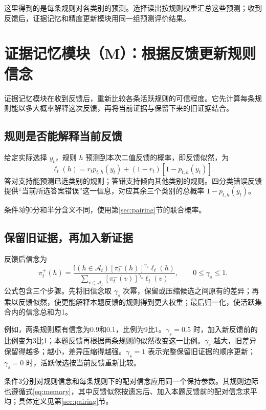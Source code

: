\documentclass[12pt]{article}
\newcommand{\ind}{\mathbb I}
\begin{document}
这里得到的是每条规则对各类别的预测。选择读出按规则权重汇总这些预测；收到反馈后，证据记忆和精度更新模块用同一组预测评价结果。

\section{证据记忆模块（M）：根据反馈更新规则信念}
\label{sec:memory}

证据记忆模块在收到反馈后，重新比较各条活跃规则的可信程度。它先计算每条规则能以多大概率解释这次反馈，再将当前证据与保留下来的旧证据结合。

\subsection{规则是否能解释当前反馈}

给定实际选择 $y_t$，规则 $h$ 预测到本次二值反馈的概率，即反馈似然，为
\begin{equation}
\ell_t(h)=r_t p_{t,h}(y_t)
+(1-r_t)[1-p_{t,h}(y_t)].
\label{eq:binary-feedback}
\end{equation}
答对支持能预测已选类别的规则；答错支持倾向其他类别的规则。四分类错误反馈提供“当前所选答案错误”这一信息，对应其余三个类别的总概率 $1-p_{t,h}(y_t)$。

条件3的0分和半分含义不同，使用第\ref{sec:pairing}节的联合概率。

\subsection{保留旧证据，再加入新证据}

反馈后信念为
\begin{equation}
\pi_t^+(h)=
\frac{\ind(h\in \mathcal A_t)[\pi_t^-(h)]^{\gamma_s}\ell_t(h)}
{\sum_{v\in \mathcal A_t}[\pi_t^-(v)]^{\gamma_s}\ell_t(v)},
\qquad 0\leq\gamma_s\leq1.
\label{eq:memory}
\end{equation}
公式包含三个步骤。先将旧信念取 $\gamma_s$ 次幂，保留或压缩候选之间原有的差异；再乘以反馈似然，使更能解释本题反馈的规则得到更大权重；最后归一化，使活跃集合内的信念总和为1。

例如，两条规则原有信念为0.9和0.1，比例为9比1。$\gamma_s=0.5$ 时，加入新反馈前的比例变为3比1；本题反馈再根据两条规则的似然改变这一比例。$\gamma_s$ 越大，旧差异保留得越多；越小，差异压缩得越强。$\gamma_s=1$ 表示完整保留旧证据的顺序更新；$\gamma_s=0$ 时，活跃候选按当前反馈重新比较。

条件3分别对规则信念和每条规则下的配对信念应用同一个保持参数。其规则边际也遵循式\eqref{eq:memory}，其中反馈似然按遗忘后、加入本题反馈前的配对信念求平均；具体定义见第\ref{sec:pairing}节。
\end{document}
